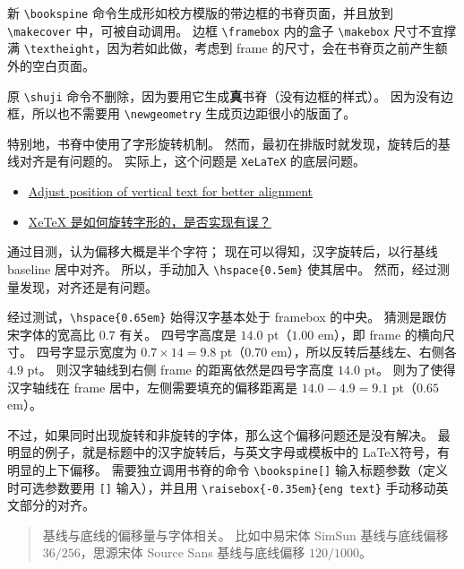 \documentclass[../Main/thesis.tex]{subfiles}
\begin{document}
新 \texttt{\textbackslash{}bookspine}
命令生成形如校方模版的带边框的书脊页面，并且放到
\texttt{\textbackslash{}makecover} 中，可被自动调用。 边框
\texttt{\textbackslash{}framebox} 内的盒子
\texttt{\textbackslash{}makebox} 尺寸不宜撑满
\texttt{\textbackslash{}textheight}，因为若如此做，考虑到 frame
的尺寸，会在书脊页之前产生额外的空白页面。

原 \texttt{\textbackslash{}shuji}
命令不删除，因为要用它生成\textbf{真}书脊（没有边框的样式）。
因为没有边框，所以也不需要用 \texttt{\textbackslash{}newgeometry}
生成页边距很小的版面了。

特别地，书脊中使用了字形旋转机制。
然而，最初在排版时就发现，旋转后的基线对齐是有问题的。
实际上，这个问题是 \texttt{XeLaTeX} 的底层问题。


\begin{itemize}
\item
  \href{https://sourceforge.net/p/xetex/bugs/164/}{Adjust position of
  vertical text for better alignment}
\item
  \href{https://github.com/CTeX-org/forum/issues/93}{XeTeX
  是如何旋转字形的，是否实现有误？}
\end{itemize}

通过目测，认为偏移大概是半个字符； 现在可以得知，汉字旋转后，以行基线
baseline 居中对齐。 所以，手动加入
\texttt{\textbackslash{}hspace\{0.5em\}} 使其居中。
然而，经过测量发现，对齐还是有问题。

经过测试，\texttt{\textbackslash{}hspace\{0.65em\}} 始得汉字基本处于
framebox 的中央。 猜测是跟仿宋字体的宽高比 \(0.7\) 有关。 四号字高度是
\(14.0\) pt（\(1.00\) em），即 frame 的横向尺寸。 四号字显示宽度为
\(0.7 \times 14 = 9.8\) pt（\(0.70\) em），所以反转后基线左、右侧各
\(4.9\) pt。 则汉字轴线到右侧 frame 的距离依然是四号字高度 \(14.0\) pt。
则为了使得汉字轴线在 frame 居中，左侧需要填充的偏移距离是
\(14.0-4.9=9.1\) pt（\(0.65\) em）。

不过，如果同时出现旋转和非旋转的字体，那么这个偏移问题还是没有解决。
最明显的例子，就是标题中的汉字旋转后，与英文字母或模板中的 \LaTeX 符号，有明显的上下偏移。 需要独立调用书脊的命令
\texttt{\textbackslash{}bookspine{[}{]}}
输入标题参数（定义时可选参数要用 \texttt{{[}{]}} 输入），并且用
\texttt{\textbackslash{}raisebox\{-0.35em\}\{eng\ text\}}
手动移动英文部分的对齐。

\begin{quote}
基线与底线的偏移量与字体相关。 比如中易宋体 SimSun 基线与底线偏移
\(36/256\)，思源宋体 Source Sans 基线与底线偏移 \(120/1000\)。
\end{quote}
\end{document}
